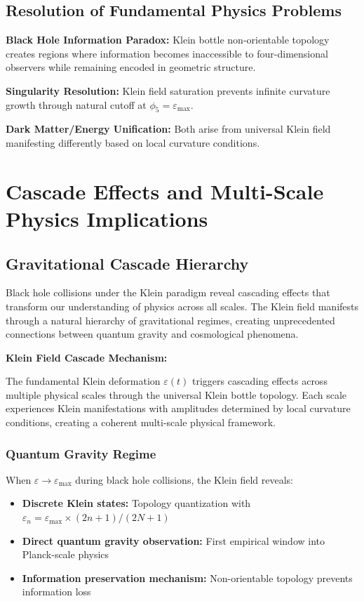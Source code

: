 \documentclass[12pt]{iopart}
\newcommand{\phifive}{\phi_5}
\newcommand{\epsmax}{\varepsilon_{\text{max}}}
\begin{document}
\subsection{Resolution of Fundamental Physics Problems}

\textbf{Black Hole Information Paradox:} Klein bottle non-orientable topology creates regions where information becomes inaccessible to four-dimensional observers while remaining encoded in geometric structure.

\textbf{Singularity Resolution:} Klein field saturation prevents infinite curvature growth through natural cutoff at $\phifive = \epsmax$.

\textbf{Dark Matter/Energy Unification:} Both arise from universal Klein field manifesting differently based on local curvature conditions.

\section{Cascade Effects and Multi-Scale Physics Implications}

\subsection{Gravitational Cascade Hierarchy}

Black hole collisions under the Klein paradigm reveal cascading effects that transform our understanding of physics across all scales. The Klein field manifests through a natural hierarchy of gravitational regimes, creating unprecedented connections between quantum gravity and cosmological phenomena.

\textbf{Klein Field Cascade Mechanism:}

The fundamental Klein deformation $\varepsilon(t)$ triggers cascading effects across multiple physical scales through the universal Klein bottle topology. Each scale experiences Klein manifestations with amplitudes determined by local curvature conditions, creating a coherent multi-scale physical framework.

\subsubsection{Quantum Gravity Regime}

When $\varepsilon \to \varepsilon_{\max}$ during black hole collisions, the Klein field reveals:
\begin{itemize}
\item \textbf{Discrete Klein states:} Topology quantization with $\varepsilon_n = \varepsilon_{\max} \times (2n+1)/(2N+1)$
\item \textbf{Direct quantum gravity observation:} First empirical window into Planck-scale physics
\item \textbf{Information preservation mechanism:} Non-orientable topology prevents information loss
\end{itemize}
\end{document}
